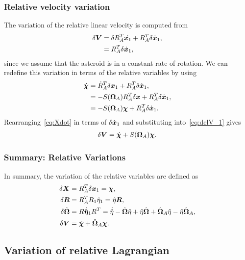 \subsubsection{Relative velocity variation}
The variation of the relative linear velocity is computed from 
\begin{align}\label{eq:delV_1}
    \delta \bm{V} &= \delta R_A^T \dot{\bm{x}_1} + R_A^T \delta \dot{\bm{x}}_1 , \nonumber \\
    &= R_A^T \delta \dot{\bm{x}}_1 ,
\end{align}
since we assume that the asteroid is in a constant rate of rotation.
We can redefine this variation in terms of the relative variables by using
\begin{align}\label{eq:Xdot}
    \dot{\bm{\chi}} &= \dot{R}_A^T \delta \bm{x}_1 + R_A^T \delta \dot{\bm{x}}_1 , \nonumber \\
    &= -S(\bm{\Omega}_A) R_A^T \delta \bm{x} + R_A^T \delta \dot{\bm{x}}_1 ,\nonumber \\
    &= -S(\bm{\Omega}_A) \bm{\chi} + R_A^T \delta \dot{\bm{x}}_1 .
\end{align}
Rearranging~\cref{eq:Xdot} in terms of \( \delta \dot{\bm{x}}_1\) and substituting into~\cref{eq:delV_1} gives
\begin{align}\label{eq:relative_velocity_variation}
    \delta \bm{V} = \dot{\bm{\chi}} + S(\bm{\Omega}_A) \bm{\chi} .
\end{align}

\subsubsection{Summary: Relative Variations}
In summary, the variation of the relative variables are defined as
\begin{align*}
    \delta \bm{X} &= R_A^T \delta \bm{x}_1 = \bm{\chi} , \\
    \delta \bm{R} &= R_A^T R_1 \hat{\eta}_1 = \hat{\eta} \bm{R} ,\\
    \delta \hat{\bm{\Omega}} &= R \dot{\hat{\bm{\eta}}}_1 R^T = \dot{\hat{\eta}} - \hat{\bm{\Omega}} \hat{\eta} + \hat{\eta} \hat{\bm{\Omega}} +  \hat{\bm{\Omega}}_A \hat{\eta} - \hat{\eta} \hat{\bm{\Omega}}_A , \\
    \delta \bm{V} &= \dot{\bm{\chi}} + \hat{\bm{\Omega}}_A \bm{\chi} .
\end{align*}
\subsection{Variation of relative Lagrangian}\label{ssec:var_rel_lagrangian}

